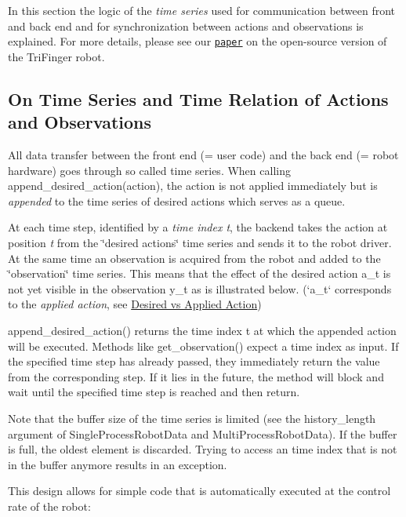 In this section the logic of the {\itshape time series} used for communication between front and back end and for synchronization between actions and observations is explained. For more details, please see our \href{https://arxiv.org/abs/2008.03596}{\tt paper} on the open-\/source version of the Tri\+Finger robot.

\subsection*{On Time Series and Time Relation of Actions and Observations }

All data transfer between the front end (= user code) and the back end (= robot hardware) goes through so called time series. When calling {\ttfamily append\+\_\+desired\+\_\+action(action)}, the action is not applied immediately but is {\itshape appended} to the time series of desired actions which serves as a queue.

At each time step, identified by a {\itshape time index t}, the backend takes the action at position {\itshape t} from the \char`\"{}desired actions\char`\"{} time series and sends it to the robot driver. At the same time an observation is acquired from the robot and added to the \char`\"{}observation\char`\"{} time series. This means that the effect of the desired action {\ttfamily a\+\_\+t} is not yet visible in the observation {\ttfamily y\+\_\+t} as is illustrated below. (`a\textquotesingle{}\+\_\+t` corresponds to the {\itshape applied action}, see \hyperlink{md_docs_desired_vs_applied_action}{Desired vs Applied Action})



{\ttfamily append\+\_\+desired\+\_\+action()} returns the time index {\ttfamily t} at which the appended action will be executed. Methods like {\ttfamily get\+\_\+observation()} expect a time index as input. If the specified time step has already passed, they immediately return the value from the corresponding step. If it lies in the future, the method will block and wait until the specified time step is reached and then return.

Note that the buffer size of the time series is limited (see the {\ttfamily history\+\_\+length} argument of {\ttfamily Single\+Process\+Robot\+Data} and {\ttfamily Multi\+Process\+Robot\+Data}). If the buffer is full, the oldest element is discarded. Trying to access an time index that is not in the buffer anymore results in an exception.

This design allows for simple code that is automatically executed at the control rate of the robot\+:


